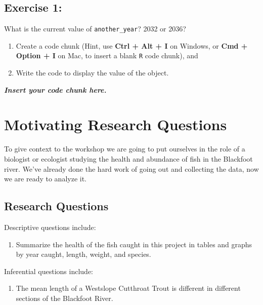 \documentclass[
  10pt,
  letterpaper,
  twoside,
  openright]{book}
\providecommand{\tightlist}{%
  \setlength{\itemsep}{0pt}\setlength{\parskip}{0pt}}
\begin{document}
\hypertarget{exercise-1}{%
\subsection{Exercise 1:}\label{exercise-1}}

What is the current value of \texttt{another\_year}? 2032 or 2036?

\begin{enumerate}
\def\labelenumi{\arabic{enumi}.}
\item
  Create a code chunk (Hint, use \textbf{Ctrl + Alt + I} on Windows, or
  \textbf{Cmd + Option + I} on Mac, to insert a blank \texttt{R} code
  chunk), and
\item
  Write the code to display the value of the object.
\end{enumerate}

\textbf{\emph{Insert your code chunk here.}}

\hypertarget{motivating-research-questions}{%
\section{Motivating Research
Questions}\label{motivating-research-questions}}

To give context to the workshop we are going to put ourselves in the
role of a biologist or ecologist studying the health and abundance of
fish in the Blackfoot river. We've already done the hard work of going
out and collecting the data, now we are ready to analyze it.

\hypertarget{research-questions}{%
\subsection{Research Questions}\label{research-questions}}

Descriptive questions include:

\begin{enumerate}
\def\labelenumi{\arabic{enumi}.}
\tightlist
\item
  Summarize the health of the fish caught in this project in tables and
  graphs by year caught, length, weight, and species.
\end{enumerate}

Inferential questions include:

\begin{enumerate}
\def\labelenumi{\arabic{enumi}.}
\tightlist
\item
  The mean length of a Westslope Cutthroat Trout is different in
  different sections of the Blackfoot River.
\end{enumerate}
\end{document}
